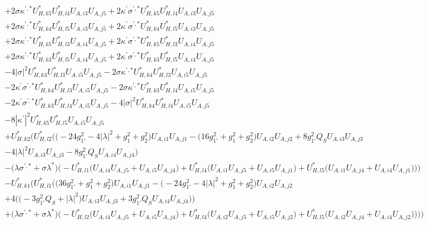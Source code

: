 \begin{align}
 &+2 \sigma \kappa^{\prime,*} U^*_{{H},{k 5}} U^*_{{H},{l 4}} U_{A,{i 3}} U_{A,{j 5}} +2 \kappa^\prime \sigma^{\prime,*} U^*_{{H},{k 5}} U^*_{{H},{l 4}} U_{A,{i 3}} U_{A,{j 5}} \nonumber \\ 
 &+2 \sigma \kappa^{\prime,*} U^*_{{H},{k 4}} U^*_{{H},{l 5}} U_{A,{i 3}} U_{A,{j 5}} +2 \kappa^\prime \sigma^{\prime,*} U^*_{{H},{k 4}} U^*_{{H},{l 5}} U_{A,{i 3}} U_{A,{j 5}} \nonumber \\ 
 &+2 \sigma \kappa^{\prime,*} U^*_{{H},{k 5}} U^*_{{H},{l 3}} U_{A,{i 4}} U_{A,{j 5}} +2 \kappa^\prime \sigma^{\prime,*} U^*_{{H},{k 5}} U^*_{{H},{l 3}} U_{A,{i 4}} U_{A,{j 5}} \nonumber \\ 
 &+2 \sigma \kappa^{\prime,*} U^*_{{H},{k 3}} U^*_{{H},{l 5}} U_{A,{i 4}} U_{A,{j 5}} +2 \kappa^\prime \sigma^{\prime,*} U^*_{{H},{k 3}} U^*_{{H},{l 5}} U_{A,{i 4}} U_{A,{j 5}} \nonumber \\ 
 &-4 |\sigma|^2 U^*_{{H},{k 3}} U^*_{{H},{l 3}} U_{A,{i 5}} U_{A,{j 5}} -2 \sigma \kappa^{\prime,*} U^*_{{H},{k 4}} U^*_{{H},{l 3}} U_{A,{i 5}} U_{A,{j 5}} \nonumber \\ 
 &-2 \kappa^\prime \sigma^{\prime,*} U^*_{{H},{k 4}} U^*_{{H},{l 3}} U_{A,{i 5}} U_{A,{j 5}} -2 \sigma \kappa^{\prime,*} U^*_{{H},{k 3}} U^*_{{H},{l 4}} U_{A,{i 5}} U_{A,{j 5}} \nonumber \\ 
 &-2 \kappa^\prime \sigma^{\prime,*} U^*_{{H},{k 3}} U^*_{{H},{l 4}} U_{A,{i 5}} U_{A,{j 5}} -4 |\sigma|^2 U^*_{{H},{k 4}} U^*_{{H},{l 4}} U_{A,{i 5}} U_{A,{j 5}} \nonumber \\ 
 &-8 |\kappa^\prime|^2 U^*_{{H},{k 5}} U^*_{{H},{l 5}} U_{A,{i 5}} U_{A,{j 5}} \nonumber \\ 
 &+U^*_{{H},{k 2}} \Big(U^*_{{H},{l 2}} \Big(\Big(-24 g_{1'}^{2}  -4 |\lambda|^2  + g_{1}^{2} + g_{2}^{2}\Big)U_{A,{i 1}} U_{A,{j 1}} - \Big(16 g_{1'}^{2}  + g_{1}^{2} + g_{2}^{2}\Big)U_{A,{i 2}} U_{A,{j 2}} +8 g_{1'}^{2} Q_{S} U_{A,{i 3}} U_{A,{j 3}} \nonumber \\ 
 &-4 |\lambda|^2 U_{A,{i 3}} U_{A,{j 3}} -8 g_{1'}^{2} Q_{S} U_{A,{i 4}} U_{A,{j 4}} \Big)\nonumber \\ 
 &- \Big(\lambda \sigma^{\prime,*}  + \sigma \lambda^* \Big)\Big(- U^*_{{H},{l 1}} \Big(U_{A,{i 4}} U_{A,{j 5}}  + U_{A,{i 5}} U_{A,{j 4}} \Big) + U^*_{{H},{l 4}} \Big(U_{A,{i 1}} U_{A,{j 5}}  + U_{A,{i 5}} U_{A,{j 1}} \Big) + U^*_{{H},{l 5}} \Big(U_{A,{i 1}} U_{A,{j 4}}  + U_{A,{i 4}} U_{A,{j 1}} \Big)\Big)\Big)\nonumber \\ 
 &- U^*_{{H},{k 1}} \Big(U^*_{{H},{l 1}} \Big(\Big(36 g_{1'}^{2}  + g_{1}^{2} + g_{2}^{2}\Big)U_{A,{i 1}} U_{A,{j 1}} - \Big(-24 g_{1'}^{2}  -4 |\lambda|^2  + g_{1}^{2} + g_{2}^{2}\Big)U_{A,{i 2}} U_{A,{j 2}} \nonumber \\ 
 &+4 \Big(\Big(-3 g_{1'}^{2} Q_{S}  + |\lambda|^2\Big)U_{A,{i 3}} U_{A,{j 3}}  + 3 g_{1'}^{2} Q_{S} U_{A,{i 4}} U_{A,{j 4}} \Big)\Big)\nonumber \\ 
 &+\Big(\lambda \sigma^{\prime,*}  + \sigma \lambda^* \Big)\Big(- U^*_{{H},{l 2}} \Big(U_{A,{i 4}} U_{A,{j 5}}  + U_{A,{i 5}} U_{A,{j 4}} \Big) + U^*_{{H},{l 4}} \Big(U_{A,{i 2}} U_{A,{j 5}}  + U_{A,{i 5}} U_{A,{j 2}} \Big) + U^*_{{H},{l 5}} \Big(U_{A,{i 2}} U_{A,{j 4}}  + U_{A,{i 4}} U_{A,{j 2}} \Big)\Big)\Big)\Big)\end{align} 
